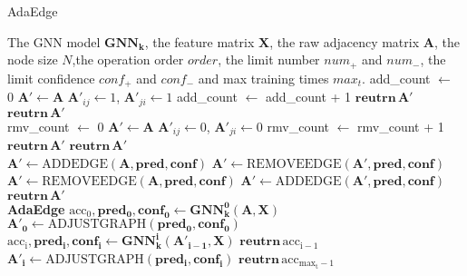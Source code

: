 \documentclass[letterpaper]{article} \usepackage{aaai20}  \usepackage{times}  \usepackage{helvet} \usepackage{courier}  \usepackage[hyphens]{url}  \usepackage{graphicx} \urlstyle{rm} \def\UrlFont{\rm}  \frenchspacing  \setlength{\pdfpagewidth}{8.5in}  \setlength{\pdfpageheight}{11in}  \setcounter{secnumdepth}{0}
\begin{document}
\begin{algorithm}[t]
\centering
\footnotesize
\begin{algorithmic}[1]
\caption{AdaEdge}\label{loop_training}
\Require
The GNN model $\mathbf{GNN_k}$, the feature matrix $\bm{X}$, the raw adjacency matrix $\bm{A}$, the node size $N$,the operation order $order$, the limit number $num_{+}$ and $num_{-}$, the limit confidence $conf_{+}$ and $conf_{-}$ and max training times $max_t$.
    \State add\_count $\gets$ 0 
    \State $\mathbf{A'} \gets \mathbf{A}$
    \For{node1 $ \mathrm{n_i} \in$  $[0,N)$}
    \For{node2 $ \mathrm{n_j} \in$  $[\mathrm{n_i},N)$}
    \State $\mathbf{A'}_{ij} \gets 1$, $\mathbf{A'}_{ji} \gets 1$
    \State add\_count $\gets$ add\_count + 1 
     \State $\mathbf{reutrn \, A'}$ \EndIf
    \EndIf
    \EndFor
    \EndFor
    \State $\mathbf{reutrn\, A'}$
\EndFunction \\
    \State rmv\_count $\gets$ 0 
    \State $\mathbf{A'} \gets \mathbf{A}$
    \State $\mathbf{A'}_{ij} \gets 0$, $\mathbf{A'}_{ji} \gets 0$
    \State rmv\_count $\gets$ rmv\_count + 1 
     \State $\mathbf{reutrn \, A'}$ \EndIf
    \EndIf
    \EndFor
    \State $\mathbf{reutrn\, A'}$
\EndFunction \\
\State $\mathbf{A'} \gets \mathrm{ADDEDGE} (\bm{A},\mathbf{pred},\mathbf{conf})$
\State $\mathbf{A'} \gets \mathrm{REMOVEEDGE} (\mathbf{A'},\mathbf{pred},\mathbf{conf})$
\Else
\State $\mathbf{A'} \gets \mathrm{REMOVEEDGE} (\bm{A},\mathbf{pred},\mathbf{conf})$
\State $\mathbf{A'} \gets \mathrm{ADDEDGE} (\mathbf{A'},\mathbf{pred},\mathbf{conf})$
\EndIf
\State $\mathbf{reutrn\, A'}$
\EndFunction \\

\State \textbf{AdaEdge}
\State $\mathrm{acc_0},\mathbf{pred_0},\mathbf{conf_0} \gets \mathbf{GNN_k^0}(\bm{A},\bm{X})$
\State $\mathbf{A'_0} \gets \mathrm{ADJUSTGRAPH}(\mathbf{pred_0},\mathbf{conf_0})$
\For{iter times $ \mathrm{i} \in [1,max_t)$ }
\State $\mathrm{acc_i},\mathbf{pred_i},\mathbf{conf_i} \gets \mathbf{GNN_k^i}(\mathbf{A'_{i-1}},\bm{X})$
\State $\mathbf{reutrn\,} \mathrm{acc_{i-1}} $
\EndIf
\State $\mathbf{A'_i} \gets
\mathrm{ADJUSTGRAPH}(\mathbf{pred_i},\mathbf{conf_i})$
\EndFor
\State $\mathbf{reutrn\,} \mathrm{acc_{max_t-1}} $
\end{algorithmic}
\end{algorithm}
\end{document}
